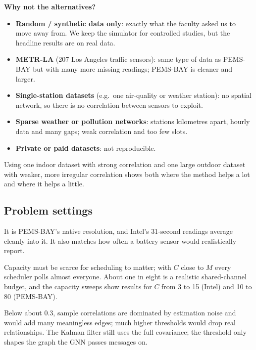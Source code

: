 \textbf{Why not the alternatives?}
\begin{itemize}
  \item \textbf{Random / synthetic data only}: exactly what the faculty asked us to move away from. We keep the
        simulator for controlled studies, but the headline results are on real data.
  \item \textbf{METR-LA} (207 Los Angeles traffic sensors): same type of data as PEMS-BAY but with many more missing
        readings; PEMS-BAY is cleaner and larger.
  \item \textbf{Single-station datasets} (e.g.\ one air-quality or weather station): no spatial network, so there is
        no correlation between sensors to exploit.
  \item \textbf{Sparse weather or pollution networks}: stations kilometres apart, hourly data and many gaps; weak
        correlation and too few slots.
  \item \textbf{Private or paid datasets}: not reproducible.
\end{itemize}
Using one indoor dataset with strong correlation and one large outdoor dataset with weaker, more irregular
correlation shows both where the method helps a lot and where it helps a little.

\subsection{Problem settings}

\begin{whybox}
It is PEMS-BAY's native resolution, and Intel's 31-second readings average cleanly into it. It also matches how often
a battery sensor would realistically report.
\end{whybox}
\begin{whybox}
Capacity must be scarce for scheduling to matter; with $C$ close to $M$ every scheduler polls almost everyone. About one
in eight is a realistic shared-channel budget, and the capacity sweeps show results for $C$ from 3 to 15 (Intel) and
10 to 80 (PEMS-BAY).
\end{whybox}
\begin{whybox}
Below about 0.3, sample correlations are dominated by estimation noise and would add many meaningless edges; much higher
thresholds would drop real relationships. The Kalman filter still uses the full covariance; the threshold only shapes
the graph the GNN passes messages on.
\end{whybox}


